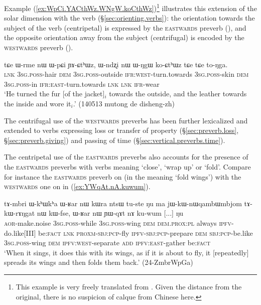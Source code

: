 Example (\ref{ex:WpCi.YACthWz.WNgW.koCthWz})\footnote{This example is very freely translated from . Given the distance from the original, there is no suspicion of calque from Chinese here. } illustrates this extension of the solar dimension with the verb  (§\ref{sec:orienting.verbs}): the orientation towards the subject of the verb (centripetal) is expressed by the \textsc{eastwards} preverb (), and the opposite orientation away from the subject (centrifugal) is encoded by the \textsc{westwards} preverb ().

\begin{exe}
\ex \label{ex:WpCi.YACthWz.WNgW.koCthWz}
\gll  tɕe ɯ-rme nɯ ɯ-pɕi ɲɤ-ɕtʰɯz, ɯ-ndʐi nɯ ɯ-ŋgɯ ko-ɕtʰɯz tɕe tɕe to-ŋga.  \\
\textsc{lnk} \textsc{3sg}.\textsc{poss}-hair \textsc{dem} \textsc{3sg}.\textsc{poss}-outside \textsc{ifr}:\textsc{west}-turn.towards \textsc{3sg}.\textsc{poss}-skin \textsc{dem} \textsc{3sg}.\textsc{poss}-in \textsc{ifr}:\textsc{east}-turn.towards \textsc{lnk} \textsc{lnk} \textsc{ifr}-wear \\
\glt `He turned the fur [of the jacket]$_i$ towards the outside, and the leather towards the inside and wore it$_i$.' (140513 mutong de disheng-zh)
\end{exe}  

The centrifugal use of the \textsc{westwards} preverbs has been further lexicalized and extended to verbs expressing loss or transfer of property (§\ref{sec:preverb.loss}, §\ref{sec:preverb.giving}) and passing of time (§\ref{sec:vertical.preverbs.time}).

The centripetal use of the \textsc{eastwards} preverbs also accounts for the presence of the \textsc{eastwards} preverbs with verbs meaning `close', `wrap up' or `fold'. Compare for instance the \textsc{eastwards} preverb on  (in the meaning `fold wings') with the \textsc{westwards} one on  in (\ref{ex:YWqAt.nA.kuwum}).

\begin{exe}
\ex \label{ex:YWqAt.nA.kuwum}
\gll  tɤ-mbri ɯ-kʰɯkʰa ɯ-ʁar nɯ kɯra ntsɯ tu-ste ŋu ma jɯ-kɯ-nɯqambɯmbjom tɤ-kɯ-rɤŋgat nɯ kɯ-fse, ɯ-ʁar nɯ ɲɯ-qɤt nɤ ku-wum [...] ŋu  \\
\textsc{aor}-make.noise \textsc{3sg}.\textsc{poss}-while \textsc{3sg}.\textsc{poss}-wing \textsc{dem} \textsc{dem}.\textsc{prox}:\textsc{pl} always \textsc{ipfv}-do.like[III] be:\textsc{fact} \textsc{lnk} \textsc{proxm}-\textsc{sbj}:\textsc{pcp}-fly \textsc{ipfv}-\textsc{sbj}:\textsc{pcp}-prepare \textsc{dem} \textsc{sbj}:\textsc{pcp}-be.like \textsc{3sg}.\textsc{poss}-wing \textsc{dem} \textsc{ipfv}:\textsc{west}-separate \textsc{add} \textsc{ipfv}:\textsc{east}-gather  {  } be:\textsc{fact} \\
\glt `When it sings, it does this with its wings, as if it is about to fly, it [repeatedly] spreads its wings and then folds them back.' (24-ZmbrWpGa)
\end{exe}


